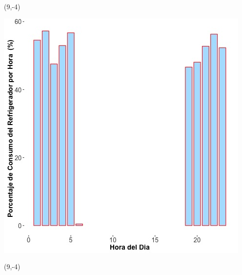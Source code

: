 \documentclass{article}\usepackage[]{graphicx}\usepackage[]{color}
\newenvironment{knitrout}{}{} %
\begin{document}
 \begin{textblock}{1}(9,-4)
\begin{minipage}{20em}
\begingroup

\endgroup
\end{minipage}
\end{textblock}

 \vspace{2cm}

\begin{knitrout}
\color{fgcolor}
\includegraphics[scale=0.65]{figure/A22_fridge_energy_pct.jpg} 
\end{knitrout}

 \begin{textblock}{1}(9,-4)
\begin{minipage}{20em}
\begingroup

\endgroup
\end{minipage}
\end{textblock}

\vspace{20cm}
\end{document}
